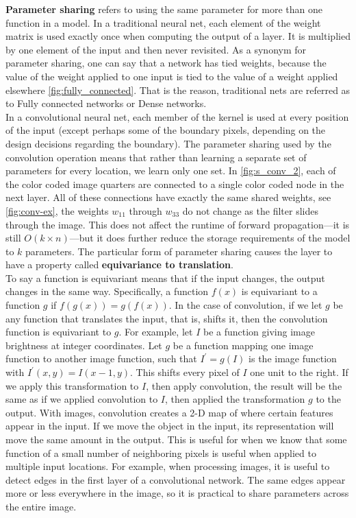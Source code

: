 \textbf{Parameter sharing} refers to using the same parameter for more than one function in a model. In a traditional neural net, each
element of the weight matrix is used exactly once when computing the output of a layer. It is multiplied by one element of the input and
then never revisited. As a synonym for parameter sharing, one can say that a network has tied weights, because the value of the
weight applied to one input is tied to the value of a weight applied elsewhere \cref{fig:fully_connected}.
That is the reason, traditional nets are referred as to Fully connected networks or Dense networks.\\

In a convolutional neural net, each member of the kernel is used at every position
of the input (except perhaps some of the boundary pixels, depending on the
design decisions regarding the boundary). The parameter sharing used by the
convolution operation means that rather than learning a separate set of parameters
for every location, we learn only one set. In \cref{fig:s_conv_2}, each of the color coded image quarters are connected to a single color
coded node in the next layer. All of these connections have exactly the same shared weights, see \cref{fig:conv-ex}, the weights $w_{11}$
through $w_{33}$ do not change as the filter slides through the image. This does not affect the runtime of
forward propagation—it is still $O(k \times n)$—but it does further reduce the storage
requirements of the model to $k$ parameters. The particular form of parameter sharing causes the
layer to have a property called \textbf{equivariance to translation}. \\

To say a function is equivariant means that if the input changes, the output changes in the same way.
Specifically, a function $f(x)$ is equivariant to a function $g$ if $f(g(x)) = g(f(x))$. In
the case of convolution, if we let $g$ be any function that translates the input, that
is, shifts it, then the convolution function is equivariant to $g$. For example, let $I$
be a function giving image brightness at integer coordinates. Let $g$ be a function
mapping one image function to another image function, such that $I^{\prime} = g(I)$ is the
image function with $I^{\prime}(x, y) = I(x - 1, y)$. This shifts every pixel of $I$ one unit to
the right. If we apply this transformation to $I$, then apply convolution, the result
will be the same as if we applied convolution to $I$, then applied the transformation
$g$ to the output. With images, convolution creates a 2-D map of where certain features appear in the input. If we move the object in the
input, its representation will move the same amount in the output. This is useful for when we know that some function of a small number of
neighboring pixels is useful when applied to multiple input locations. For example, when processing
images, it is useful to detect edges in the first layer of a convolutional network.
The same edges appear more or less everywhere in the image, so it is practical to share parameters across the entire image. \\


